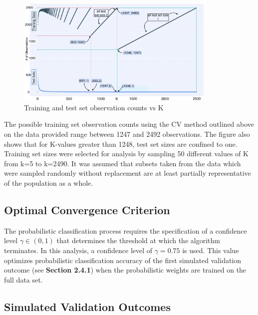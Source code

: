 \documentclass[12pt,]{article}
\begin{document}
\newpage

\begin{figure}
\begin{center}
\includegraphics[width=0.85\textwidth]{KvsTrainlen.jpeg}
\caption{Training and test set observation counts vs K}
\end{center}
\end{figure}

The possible training set observation counts using the CV method
outlined above on the data provided range between 1247 and 2492
observations. The figure also shows that for K-values greater than 1248,
test set sizes are confined to one. Training set sizes were selected for
analysis by sampling 50 different values of K from k=5 to k=2490. It was
assumed that subsets taken from the data which were sampled randomly
without replacement are at least partially representative of the
population as a whole.

\hypertarget{optimal-convergence-criterion}{%
\subsection{Optimal Convergence
Criterion}\label{optimal-convergence-criterion}}

The probabilistic classification process requires the specification of a
confidence level \(\gamma \in (0,1)\) that determines the threshold at
which the algorithm terminates. In this analysis, a confidence level of
\(\gamma=0.75\) is used. This value optimizes probabilistic
classification accuracy of the first simulated validation outcome (see
\textbf{Section 2.4.1}) when the probabilistic weights are trained on
the full data set.

\hypertarget{simulated-validation-outcomes}{%
\subsection{Simulated Validation
Outcomes}\label{simulated-validation-outcomes}}
\end{document}
